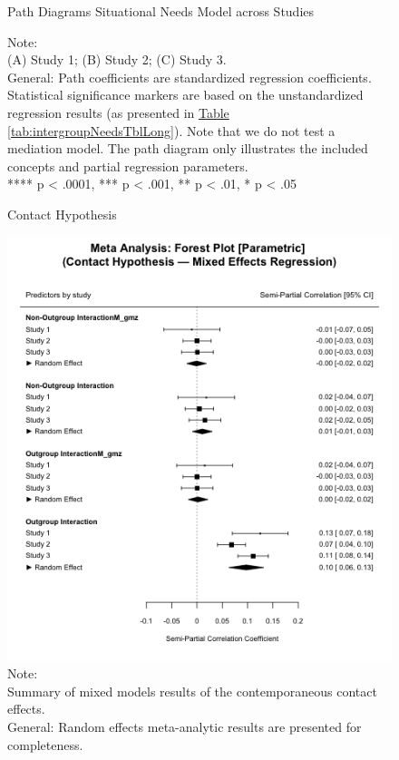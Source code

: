 \documentclass[man, 12pt, a4paper, mask]{apa7}
\theoremstyle{break}
\theoremstyle{plain}
\newcommand{\tblref}[2][]{\hyperref[#2]{Table \ref*{#2}#1}}
\begin{document}
\begin{figure}
  \caption{Path Diagrams Situational Needs Model across Studies}
  \label{fig:MainPaths}
  \begin{center}
    
  \end{center}
  \caption*{Note: \\
  (A) Study 1; (B) Study 2; (C) Study 3.\\
  General: Path coefficients are standardized regression coefficients. Statistical significance markers are based on the unstandardized regression results (as presented in \tblref{tab:intergroupNeedsTblLong}). Note that we do not test a mediation model. The path diagram only illustrates the included concepts and partial regression parameters.\\
  **** p < .0001, *** p < .001, ** p < .01, * p < .05}
\end{figure}

\begin{figure}
  \caption{Contact Hypothesis}
  \label{fig:ContactHypothesis}
  \centering\includegraphics[width=\textwidth]{Figures/forestParametricREMLGeneralLmer.png}
  \caption*{Note: \\
  Summary of mixed models results of the contemporaneous contact effects.\\
  General: Random effects meta-analytic results are presented for completeness.}
\end{figure}
\end{document}
